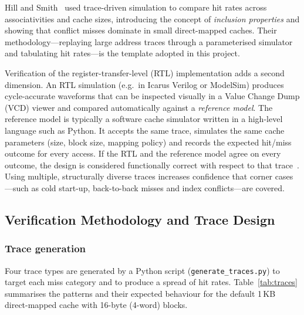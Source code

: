 Hill and Smith~\cite{hill1989associativity} used trace-driven simulation to
compare hit rates across associativities and cache sizes, introducing the
concept of \emph{inclusion properties} and showing that conflict misses
dominate in small direct-mapped caches.  Their methodology---replaying
large address traces through a parameterised simulator and tabulating hit
rates---is the template adopted in this project.

Verification of the register-transfer-level (RTL) implementation adds a
second dimension.  An RTL simulation (e.g.\ in Icarus Verilog or
ModelSim) produces cycle-accurate waveforms that can be inspected visually
in a Value Change Dump (VCD) viewer and compared automatically against a
\emph{reference model}.  The reference model is typically a software cache
simulator written in a high-level language such as Python.  It accepts the
same trace, simulates the same cache parameters (size, block size, mapping
policy) and records the expected hit/miss outcome for every access.  If the
RTL and the reference model agree on every outcome, the design is
considered functionally correct with respect to that
trace~\cite{patterson2020organization}.  Using multiple, structurally
diverse traces increases confidence that corner cases---such as cold
start-up, back-to-back misses and index conflicts---are covered.


\subsection{Verification Methodology and Trace Design}
\label{sec:m4-solution}

\subsubsection{Trace generation}
Four trace types are generated by a Python script
(\texttt{generate\_traces.py}) to target each miss category and to produce
a spread of hit rates.  Table~\ref{tab:traces} summarises the patterns and
their expected behaviour for the default 1\,KB direct-mapped cache with
16-byte (4-word) blocks.

